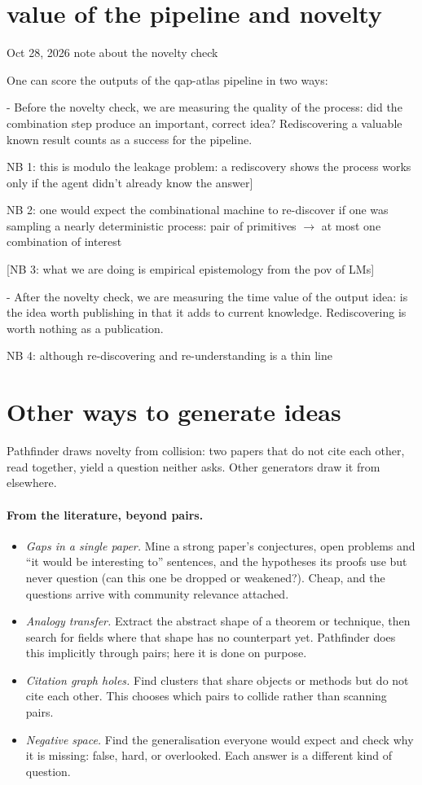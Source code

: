 \documentclass[10pt]{article}
\begin{document}
\section{value of the pipeline and novelty}
Oct 28, 2026 note about the novelty check

One can score the outputs of the qap-atlas pipeline in two ways:

- Before the novelty check, we are measuring the quality of the process:
did the combination
step produce an important, correct idea? Rediscovering a valuable known
result counts as a success for the pipeline.

NB 1: this is modulo
the leakage problem: a rediscovery shows the process works only if the agent didn't already know the answer]

NB 2: one would expect the combinational machine to re-discover if one was sampling a nearly deterministic
process: pair of primitives $\to$ at most one combination of interest

[NB 3: what we are doing is empirical epistemology from the pov of LMs]

- After the novelty check, we are measuring the time value of the output idea: is the idea
worth publishing in that it adds to current knowledge. Rediscovering is
worth nothing as a publication.

NB 4: although re-discovering and re-understanding is a thin line

\section{Other ways to generate ideas}

Pathfinder draws novelty from collision: two papers that do not cite each other, read together, yield a question
neither asks. Other generators draw it from elsewhere.

\paragraph{From the literature, beyond pairs.}
\begin{itemize}
  \item \emph{Gaps in a single paper.} Mine a strong paper's conjectures, open problems and ``it would be
  interesting to'' sentences, and the hypotheses its proofs use but never question (can this one be dropped or
  weakened?). Cheap, and the questions arrive with community relevance attached.
  \item \emph{Analogy transfer.} Extract the abstract shape of a theorem or technique, then search for fields where
  that shape has no counterpart yet. Pathfinder does this implicitly through pairs; here it is done on purpose.
  \item \emph{Citation graph holes.} Find clusters that share objects or methods but do not cite each other. This
  chooses which pairs to collide rather than scanning pairs.
  \item \emph{Negative space.} Find the generalisation everyone would expect and check why it is missing: false,
  hard, or overlooked. Each answer is a different kind of question.
\end{itemize}
\end{document}
